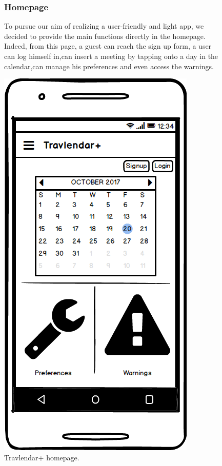 	\begin{figure}
			\begin{flushleft}
			\subsubsection{Homepage}
			To pursue our aim of realizing a user-friendly and light app, we decided to provide the main functions directly in the homepage. Indeed, from this page, a guest can reach the sign up form, a user can log himself in,can insert a meeting by tapping onto a day in the calendar,can manage his preferences and even access the warnings. \\ 
		\end{flushleft}
		\centering
		\includegraphics[width=0.6\linewidth]{mockups/Homepage}
		\caption{Travlendar+ homepage.  
		}
	\label{fig:homepage}
	\end{figure}

